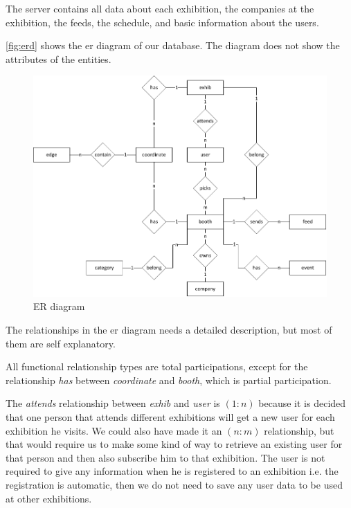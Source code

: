 The server contains all data about each exhibition, the companies at the exhibition, the feeds, the schedule, and basic information about the users.

\autoref{fig:erd} shows the \ac{er} diagram of our database. The diagram does not show the attributes of the entities.

\begin{figure}[H]
\centering
\includegraphics[page=1,width=1\linewidth]{img/sw7ERD.pdf}
\caption{ER diagram}
\label{fig:erd}
\end{figure}

\newcommand{\rel}[2]{$(#1:#2)$}

The relationships in the \ac{er} diagram needs a detailed description, but most of them are self explanatory.

All functional relationship types are total participations, except for the relationship \textit{has} between \textit{coordinate} and \textit{booth}, which is partial participation.

The \textit{attends} relationship between \textit{exhib} and \textit{user} is \rel{1}{n} because it is decided that one person that attends different exhibitions will get a new user for each exhibition he visits. We could also have made it an \rel{n}{m} relationship, but that would require us to make some kind of way to retrieve an existing user for that person and then also subscribe him to that exhibition. The user is not required to give any information when he is registered to an exhibition i.e. the registration is automatic, then we do not need to save any user data to be used at other exhibitions.

